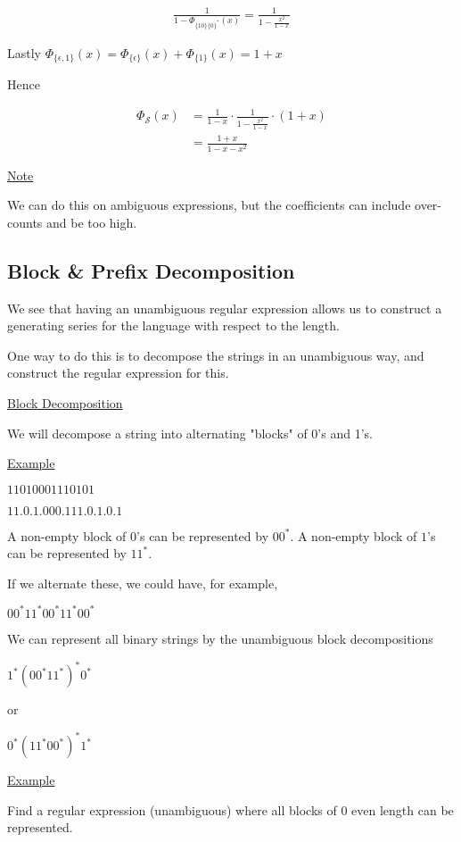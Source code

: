 \documentclass{article}
\newcommand\mc{\mathcal}
\begin{document}
\begin{align*}
    \frac{1}{1-\Phi_{\{10\}\{0\}^*}(x)} = \frac{1}{1-\frac{x^2}{1-x}}
\end{align*}

Lastly $\Phi_{\{\epsilon,1\}}(x) = \Phi_{\{\epsilon\}}(x) + \Phi_{\{1\}}(x) = 1 + x$

Hence

\begin{align*}
    \Phi_{\mc{S}}(x) &= \frac{1}{1-x} \cdot \frac{1}{1-\frac{x^2}{1-x}} \cdot (1+x) \\
    &= \frac{1+x}{1-x-x^2}
\end{align*}

\underline{Note}

We can do this on ambiguous expressions, but the coefficients can include over-counts and be too high.


\subsection{Block \& Prefix Decomposition}

We see that having an unambiguous regular expression allows us to construct a generating series for the language with respect to the length.

One way to do this is to decompose the strings in an unambiguous way, and construct the regular expression for this.

\underline{Block Decomposition}

We will decompose a string into alternating "blocks" of 0's and 1's.

\underline{Example}

$11010001110101$

$11.0.1.000.111.0.1.0.1$

A non-empty block of $0$'s can be represented by $00^*$.
A non-empty block of $1$'s can be represented by $11^*$.

If we alternate these, we could have, for example,

$00^*11^*00^*11^*00^*$

We can represent all binary strings by the unambiguous block decompositions

$1^*(00^*11^*)^*0^*$

or 

$0^*(11^*00^*)^*1^*$

\underline{Example}

Find a regular expression (unambiguous) where all blocks of 0 even length can be represented.
\end{document}
